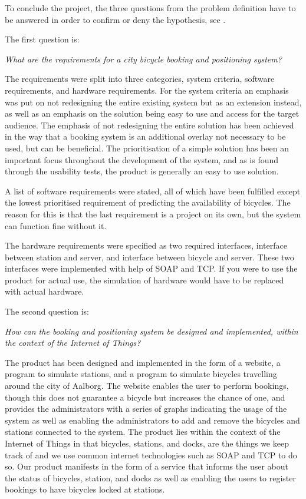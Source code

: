 To conclude the project, the three questions from the problem definition have to be answered in order to confirm or deny the hypothesis, see .

The first question is:
\begin{center}
	\textit{What are the requirements for a city bicycle booking and positioning system?}
\end{center}

The requirements were split into three categories, system criteria, software requirements, and hardware requirements.
For the system criteria an emphasis was put on not redesigning the entire existing system but as an extension instead, as well as an emphasis on the solution being easy to use and access for the target audience.
The emphasis of not redesigning the entire solution has been achieved in the way that a booking system is an additional overlay not necessary to be used, but can be beneficial.
The prioritisation of a simple solution has been an important focus throughout the development of the system, and as is found through the usability tests, the product is generally an easy to use solution.

A list of software requirements were stated, all of which have been fulfilled except the lowest prioritised requirement of predicting the availability of bicycles. The reason for this is that the last requirement is a project on its own, but the system can function fine without it.

The hardware requirements were specified as two required interfaces, interface between station and server, and interface between bicycle and server.
These two interfaces were implemented with help of SOAP and TCP. 
If you were to use the product for actual use, the simulation of hardware would have to be replaced with actual hardware.

The second question is:
\begin{center}
	\textit{How can the booking and positioning system be designed and implemented, within the context of the Internet of Things?}
\end{center}

The product has been designed and implemented in the form of a website, a program to simulate stations, and a program to simulate bicycles travelling around the city of Aalborg.
The website enables the user to perform bookings, though this does not guarantee a bicycle but increases the chance of one, and provides the administrators with a series of graphs indicating the usage of the system as well as enabling the administrators to add and remove the bicycles and stations connected to the system.
The product lies within the context of the Internet of Things in that bicycles, stations, and docks, are the things we keep track of and we use common internet technologies such as SOAP and TCP to do so.
Our product manifests in the form of a service that informs the user about the status of bicycles, station, and docks as well as enabling the users to register bookings to have bicycles locked at stations.

